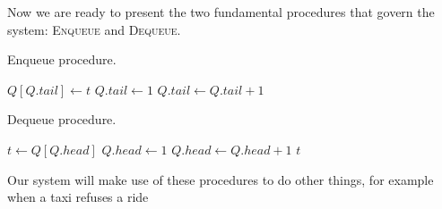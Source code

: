 Now we are ready to present the two fundamental procedures that govern the system: \textsc{Enqueue} and \textsc{Dequeue}.

\newpage %

\begin{algorithm}
\caption{Enqueue procedure.}
\label{alg:enqueue}
\begin{algorithmic}[0]
 
	\State $Q\left[Q.tail\right] \gets t$
		\State $Q.tail \gets 1$ 
	\Else
		\State $Q.tail \gets Q.tail + 1$
	\EndIf
\EndProcedure
\end{algorithmic}
\end{algorithm}

\begin{algorithm}
\caption{Dequeue procedure.}
\label{alg:dequeue}
\begin{algorithmic}[0]
  \label{procedu}
	\State $t \gets Q\left[Q.head\right]$
		\State $Q.head \gets 1$
	\Else
		\State $Q.head \gets Q.head + 1$
	\EndIf
	\State \Return $t$ 
\EndProcedure
\end{algorithmic}
\end{algorithm}

Our system will make use of these procedures to do other things, for example when a taxi refuses a ride 



